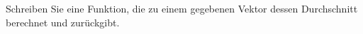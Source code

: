 \begin{aufg}[0]
Schreiben Sie eine Funktion, die zu einem gegebenen Vektor
  dessen Durchschnitt berechnet und zurückgibt.
\end{aufg}